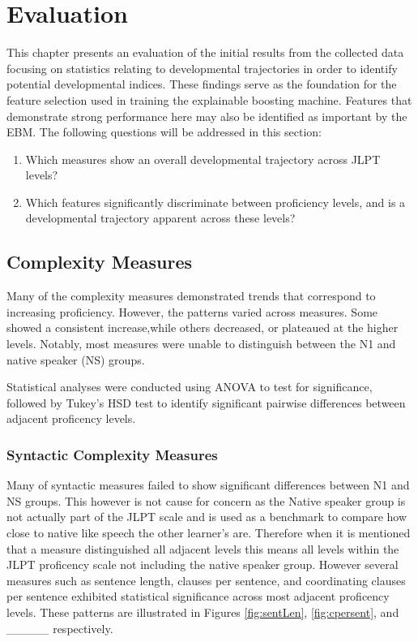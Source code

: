 \chapter{Evaluation} 
This chapter presents an evaluation of the initial results from the collected data focusing on statistics relating to
developmental trajectories in order to identify potential developmental indices. These findings serve as the
foundation
for the feature selection used in training the explainable boosting machine. Features that demonstrate strong
performance here may also be identified as important by the EBM. The following questions will be addressed in this
section:

\begin{enumerate}
    \item Which measures show an overall developmental trajectory across JLPT levels?
    \item Which features significantly discriminate between proficiency levels, and is a developmental trajectory
    apparent across these levels?
\end{enumerate}

\section{Complexity Measures}

Many of the complexity measures demonstrated trends that correspond to increasing proficiency. However, the patterns
varied across measures. Some showed a consistent increase,while others
decreased, or plateaued at the
higher levels. Notably, most measures were unable to distinguish between the N1 and native speaker (NS) groups.

Statistical analyses were conducted using ANOVA to test for significance, followed by Tukey's HSD test to identify
significant pairwise differences between adjacent proficency levels.

\subsection{Syntactic Complexity Measures}


Many of syntactic measures failed to show significant differences between N1 and NS groups. This however is not
cause for concern as the Native speaker group is not actually part of the JLPT scale and is used as a benchmark to
compare how close to native like speech the other learner's are. Therefore when it is mentioned that a measure
distinguished all adjacent levels this means all levels within the JLPT proficency scale not including the native
speaker group.
However several measures
such as sentence length, clauses per sentence, and coordinating clauses per sentence exhibited statistical significance
across most
adjacent proficency levels. These patterns are illustrated in Figures \ref{fig:sentLen}, \ref{fig:cpersent}, and
_____ respectively.

